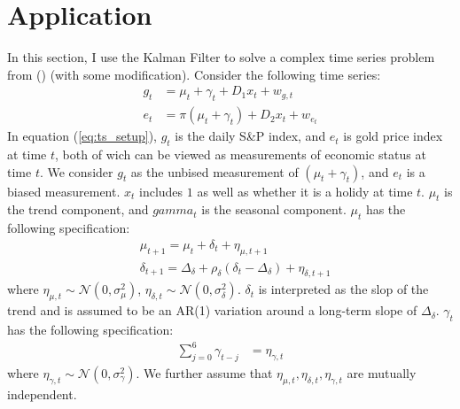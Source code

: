 \documentclass[10pt]{article}
\numberwithin{equation}{section}
\begin{document}
\section{Application} \label{sec:apply}
In this section, I use the Kalman Filter to solve a complex time series problem from (\cite{brodersen_etal_2015}) (with some modification). Consider the following time series: 
\begin{align}
    g_t &= \mu_t + \gamma_t + D_1x_t + w_{g,t} \label{eq:ts_setup} \\
    e_t &= \pi(\mu_t + \gamma_t) + D_2x_t + w_{e_t}
\end{align}
In equation (\ref{eq:ts_setup}), $g_t$ is the daily S\&P index, and $e_t$ is gold price index at time $t$, both of wich can be viewed as measurements of economic status at time $t$. We consider $g_t$ as the unbised measurement of $(\mu_t+\gamma_t)$, and $e_t$ is a biased measurement. $x_t$ includes $1$ as well as whether it is a holidy at time $t$. $\mu_t$ is the trend component, and $gamma_t$ is the seasonal component. $\mu_t$ has the following specification:
\begin{align}
    &\mu_{t+1} = \mu_{t} + \delta_t + \eta_{\mu,t+1} \\
    &\delta_{t+1} = \Delta_{\delta} + \rho_{\delta}(\delta_t - \Delta_{\delta}) + \eta_{\delta,t+1} 
\end{align}
where $\eta_{\mu,t}\sim\mathcal{N}(0,\sigma_{\mu}^2)$, $\eta_{\delta,t}\sim\mathcal{N}(0,\sigma_{\delta}^2)$. $\delta_t$ is interpreted as the slop of the trend and is assumed to be an AR(1) variation around a long-term slope of $\Delta_{\delta}$. $\gamma_t$ has the following specification:
\begin{align}
    \sum_{j=0}^6\gamma_{t-j} &= \eta_{\gamma,t}
\end{align}
where $\eta_{\gamma,t}\sim\mathcal{N}(0,\sigma_{\gamma}^2)$. We further assume that $\eta_{\mu,t},\eta_{\delta,t},\eta_{\gamma,t}$ are mutually independent. 
\end{document}
